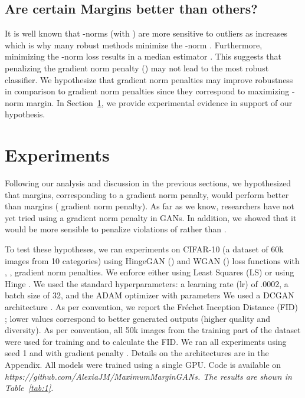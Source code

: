 \documentclass{article}
\begin{document}
\subsection{Are certain Margins better than others?}
\label{sec:5.4}

It is well known that -norms (with ) are more sensitive to outliers as  increases which is why many robust methods minimize the -norm \citep{bloomfield1983least}. Furthermore, minimizing the -norm loss results in a median estimator \citep{bloomfield1983least}. This suggests that  penalizing the  gradient norm penalty () may not lead to the most robust classifier. We hypothesize that  gradient norm penalties may improve robustness in comparison to  gradient norm penalties since they correspond to maximizing -norm margin.
In Section~\ref{sec:6}, we provide experimental evidence in support of our hypothesis. 


\section{Experiments}
\label{sec:6}

Following our analysis and discussion in the previous sections, we hypothesized that  margins, corresponding to a  gradient norm penalty, would perform better than  margins ( gradient norm penalty).
As far as we know, researchers have not yet tried using a  gradient norm penalty in GANs.
In addition, we showed that it would be more sensible to penalize violations of  rather than .

To test these hypotheses, we ran experiments on CIFAR-10 (a dataset of 60k images from 10 categories) \citep{krizhevsky2009learning} using HingeGAN () and WGAN () loss functions with , ,  gradient norm penalties. We enforce either  using Least Squares (LS)  or  using Hinge . We used the standard hyperparameters: a learning rate (lr) of .0002, a batch size of 32, and the ADAM optimizer \citep{Adam} with parameters  We used a DCGAN architecture \citep{DCGAN}. As per convention, we report the Fréchet Inception Distance (FID) \citep{heusel2017gans}; lower values correspond to better generated outputs (higher quality and diversity). As per convention, all 50k images from the training part of the dataset were used for training and to calculate the FID. We ran all experiments using seed 1 and with gradient penalty . Details on the architectures are in the Appendix. All models were trained using a single GPU. Code is available on \em https://github.com/AlexiaJM/MaximumMarginGANs\em. The results are shown in Table~\ref{tab:1}.
\end{document}
